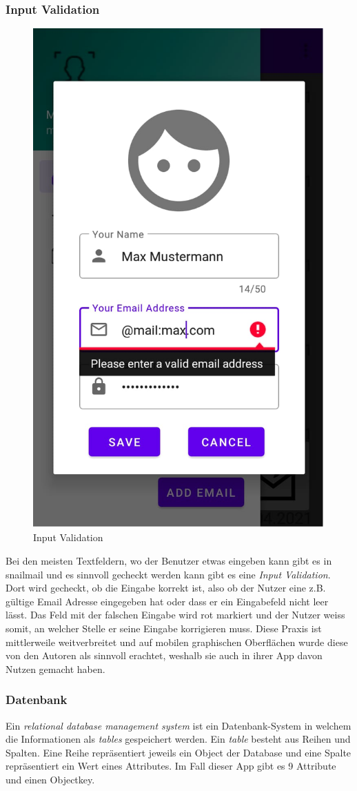 \documentclass[a4paper,11pt]{article}
\begin{document}
\subsubsection{Input Validation}
\begin{figure}
\centering
\includegraphics[width=.18\textwidth]{media/inputValidation.png}
\caption{Input Validation}
\end{figure}

Bei den meisten Textfeldern, wo der Benutzer etwas eingeben kann gibt es in snailmail und es sinnvoll gecheckt werden kann gibt es eine \textit{Input Validation}. Dort wird gecheckt, ob die Eingabe korrekt ist, also ob der Nutzer eine z.B. gültige Email Adresse eingegeben hat oder dass er ein Eingabefeld nicht leer lässt. Das Feld mit der falschen Eingabe wird rot markiert und der Nutzer weiss somit, an welcher Stelle er seine Eingabe korrigieren muss. Diese Praxis ist mittlerweile weitverbreitet und auf mobilen graphischen Oberflächen wurde diese von den Autoren als sinnvoll erachtet, weshalb sie auch in ihrer App davon Nutzen gemacht haben.

\subsubsection{Datenbank}



Ein \textit{relational database management system} ist ein Datenbank-System in welchem die Informationen als \textit{tables} gespeichert werden. 
Ein \textit{table} besteht aus Reihen und Spalten. Eine Reihe repräsentiert jeweils ein Object der Database und eine Spalte repräsentiert ein Wert eines Attributes. Im Fall dieser App
gibt es 9 Attribute und einen Objectkey. \cite{riccardi2001} \\
\end{document}

